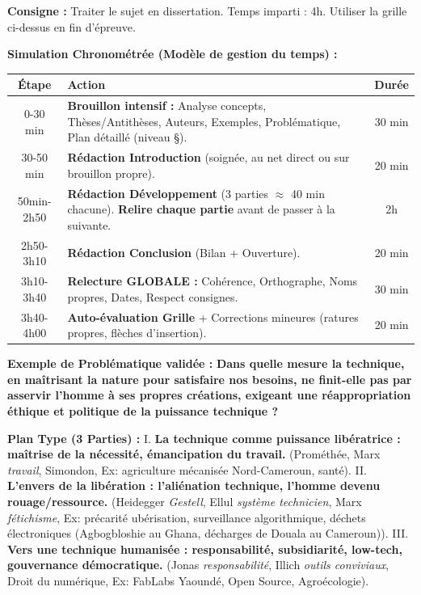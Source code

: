 \documentclass[11pt]{article}
\begin{document}
\begin{exoresolu}
\textbf{Consigne :} Traiter le sujet en dissertation. Temps imparti : 4h. Utiliser la grille ci-dessus en fin d'épreuve.

\tcblower
\textbf{Simulation Chronométrée (Modèle de gestion du temps) :}
\begin{center}
\begin{tabularx}{\linewidth}{|c|X|c|}\hline
\textbf{Étape} & \textbf{Action} & \textbf{Durée} \\ \hline
0-30 min & \textbf{Brouillon intensif :} Analyse concepts, Thèses/Antithèses, Auteurs, Exemples, Problématique, Plan détaillé (niveau §). & 30 min \\ \hline
30-50 min & \textbf{Rédaction Introduction} (soignée, au net direct ou sur brouillon propre). & 20 min \\ \hline
50min-2h50 & \textbf{Rédaction Développement} (3 parties $\approx$ 40 min chacune). \textbf{Relire chaque partie} avant de passer à la suivante. & 2h \\ \hline
2h50-3h10 & \textbf{Rédaction Conclusion} (Bilan + Ouverture). & 20 min \\ \hline
3h10-3h40 & \textbf{Relecture GLOBALE :} Cohérence, Orthographe, Noms propres, Dates, Respect consignes. & 30 min \\ \hline
3h40-4h00 & \textbf{Auto-évaluation Grille} + Corrections mineures (ratures propres, flèches d'insertion). & 20 min \\ \hline
\end{tabularx}
\end{center}

\textbf{Exemple de Problématique validée :}
\og \textbf{Dans quelle mesure la technique, en maîtrisant la nature pour satisfaire nos besoins, ne finit-elle pas par asservir l'homme à ses propres créations, exigeant une réappropriation éthique et politique de la puissance technique ?} \fg

\textbf{Plan Type (3 Parties) :}
I. \textbf{La technique comme puissance libératrice : maîtrise de la nécessité, émancipation du travail.} (Prométhée, Marx \emph{travail}, Simondon, Ex: agriculture mécanisée Nord-Cameroun, santé).
II. \textbf{L'envers de la libération : l'aliénation technique, l'homme devenu rouage/ressource.} (Heidegger \textit{Gestell}, Ellul \emph{système technicien}, Marx \emph{fétichisme}, Ex: précarité ubérisation, surveillance algorithmique, déchets électroniques (Agbogbloshie au Ghana, décharges de Douala au Cameroun)).
III. \textbf{Vers une technique humanisée : responsabilité, subsidiarité, low-tech, gouvernance démocratique.} (Jonas \emph{responsabilité}, Illich \emph{outils conviviaux}, Droit du numérique, Ex: FabLabs Yaoundé, Open Source, Agroécologie).


\end{exoresolu}
\end{document}
